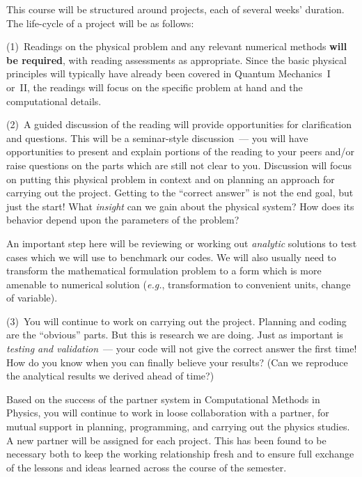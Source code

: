 \documentclass[12pt]{mcplain}
\begin{document}
This course will be structured around projects, each of several weeks' duration.
The life-cycle of a project will be as follows:

\begin{leftindent}

  (1)~Readings on the physical problem and any relevant numerical methods
  \textbf{will be required}, with reading assessments as appropriate.  Since
  the basic physical principles will typically have already been covered in
  Quantum Mechanics~I or~II, the readings will focus on the specific problem at
  hand and the computational details.

  (2)~A guided discussion of the reading will provide opportunities for
  clarification and questions.  This will be a seminar-style discussion~--- you
  will have opportunities to present and explain portions of the reading to your
  peers and/or raise questions on the parts which are still not clear to you.
  Discussion will focus on putting this physical problem in context and on
  planning an approach for carrying out the project.  Getting to the ``correct
  answer'' is not the end goal, but just the start!  What \textit{insight} can
  we gain about the physical system?  How does its behavior depend upon the
  parameters of the problem?

  An important step here will be reviewing or working out \textit{analytic}
  solutions to test cases which we will use to benchmark our codes.  We will
  also usually need to transform the mathematical formulation problem to a form
  which is more amenable to numerical solution (\textit{e.g.}, transformation to
  convenient units, change of variable).

  (3)~You will continue to work on carrying out the project. Planning and coding
  are the ``obvious'' parts.  But this is research we are doing.  Just as
  important is \textit{testing and validation}~--- your code will not give the
  correct answer the first time!  How do you know when you can finally believe
  your results?  (Can we reproduce the analytical results we derived ahead of
  time?)

  Based on the success of the partner system in Computational Methods in
  Physics, you will continue to work in loose collaboration with a partner, for
  mutual support in planning, programming, and carrying out the physics studies.
  A new partner will be assigned for each project.  This has been found to be
  necessary both to keep the working relationship fresh and to ensure full
  exchange of the lessons and ideas learned across the course of the semester.


\end{leftindent}
\end{document}
